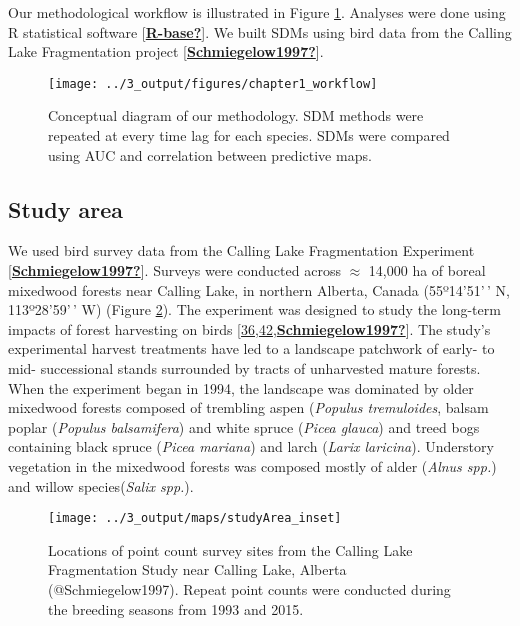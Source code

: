 \documentclass[manuscript, 3p, authoryear]{elsarticle} %
\begin{document}
Our methodological workflow is illustrated in Figure \ref{fig:workflow}. Analyses were done using R statistical software {[}\protect\hyperlink{ref-R-base}{\textbf{R-base?}}{]}. We built SDMs using bird data from the Calling Lake Fragmentation project {[}\protect\hyperlink{ref-Schmiegelow1997}{\textbf{Schmiegelow1997?}}{]}.

\begin{figure}[htb]
\texttt{[image: ../3\_output/figures/chapter1\_workflow]} \caption{Conceptual diagram of our methodology. SDM methods were repeated at every time lag for each species. SDMs were compared using AUC and correlation between predictive maps.}\label{fig:workflow}
\end{figure}

\hypertarget{study-area}{%
\subsection{Study area}\label{study-area}}

We used bird survey data from the Calling Lake Fragmentation Experiment {[}\protect\hyperlink{ref-Schmiegelow1997}{\textbf{Schmiegelow1997?}}{]}. Surveys were conducted across \(\approx\) 14,000 ha of boreal mixedwood forests near Calling Lake, in northern Alberta, Canada (55º14'51'\,' N, 113º28'59'\,' W) (Figure \ref{fig:studyArea}). The experiment was designed to study the long-term impacts of forest harvesting on birds {[}\protect\hyperlink{ref-lestonLongtermChangesBoreal2018}{36},\protect\hyperlink{ref-hannonCorridorsMayNot2002}{42},\protect\hyperlink{ref-Schmiegelow1997}{\textbf{Schmiegelow1997?}}{]}. The study's experimental harvest treatments have led to a landscape patchwork of early- to mid- successional stands surrounded by tracts of unharvested mature forests. When the experiment began in 1994, the landscape was dominated by older mixedwood forests composed of trembling aspen (\emph{Populus tremuloides}, balsam poplar (\emph{Populus balsamifera}) and white spruce (\emph{Picea glauca}) and treed bogs containing black spruce (\emph{Picea mariana}) and larch (\emph{Larix laricina}). Understory vegetation in the mixedwood forests was composed mostly of alder (\emph{Alnus spp.}) and willow species(\emph{Salix spp.}).

\begin{figure}[htb]
\texttt{[image: ../3\_output/maps/studyArea\_inset]} \caption{Locations of point count survey sites from the Calling Lake Fragmentation Study near Calling Lake, Alberta (@Schmiegelow1997). Repeat point counts were conducted during the breeding seasons from 1993 and 2015.}\label{fig:studyArea}
\end{figure}
\end{document}
